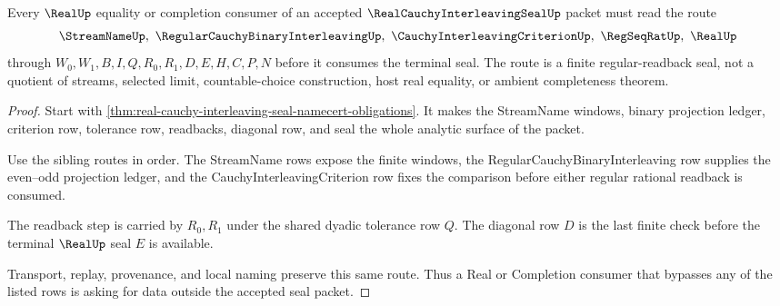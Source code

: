 \begin{theorem}
\label{thm:real-cauchy-interleaving-seal-regular-readback}
Every $\RealUp$ equality or completion consumer of an accepted $\RealCauchyInterleavingSealUp$ packet must read the route
$$
\StreamNameUp,\ \RegularCauchyBinaryInterleavingUp,\ \CauchyInterleavingCriterionUp,\ \RegSeqRatUp,\ \RealUp
$$
through $W_0,W_1,B,I,Q,R_0,R_1,D,E,H,C,P,N$ before it consumes the terminal seal. The route is a finite regular-readback seal, not a quotient of streams, selected limit, countable-choice construction, host real equality, or ambient completeness theorem.
\end{theorem}
\begin{proof}
Start with \autoref{thm:real-cauchy-interleaving-seal-namecert-obligations}. It makes the StreamName windows, binary projection ledger, criterion row, tolerance row, readbacks, diagonal row, and seal the whole analytic surface of the packet.

Use the sibling routes in order. The StreamName rows expose the finite windows, the RegularCauchyBinaryInterleaving row supplies the even--odd projection ledger, and the CauchyInterleavingCriterion row fixes the comparison before either regular rational readback is consumed.

The readback step is carried by $R_0,R_1$ under the shared dyadic tolerance row $Q$. The diagonal row $D$ is the last finite check before the terminal $\RealUp$ seal $E$ is available.

Transport, replay, provenance, and local naming preserve this same route. Thus a Real or Completion consumer that bypasses any of the listed rows is asking for data outside the accepted seal packet.
\end{proof}



